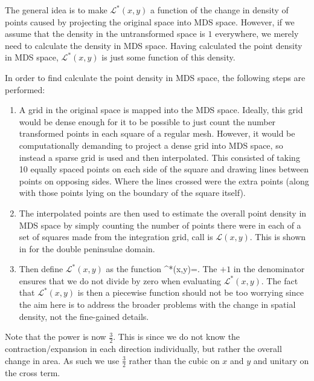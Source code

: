 {The general idea is to make $\mathcal{L}^*(x,y)$ a function of the change in density of points caused by projecting the original space into MDS space. However, if we assume that the density in the untransformed space is $1$ everywhere, we merely need to calculate the density in MDS space. Having calculated the point density in MDS space, $\mathcal{L}^*(x,y)$ is just some function of this density.

In order to find calculate the point density in MDS space, the following steps are performed:

\begin{enumerate}
\item A grid in the original space is mapped into the MDS space. Ideally, this grid would be dense enough for it to be possible to just count the number transformed points in each square of a regular mesh. However, it would be computationally demanding to project a dense grid into MDS space, so instead a sparse grid is used and then interpolated. This consisted of taking 10 equally spaced points on each side of the square and drawing lines between points on opposing sides. Where the lines crossed were the extra points (along with those points lying on the boundary of the square itself).
\item The interpolated points are then used to estimate the overall point density in MDS space by simply counting the number of points there were in each of a set of squares made from the integration grid, call is $\mathcal{L}(x,y)$. This is shown in  for the double peninsulae domain. 
\item Then define $\mathcal{L}^*(x,y)$ as the function
\be
{}^*(x,y)=.
\ee
The $+1$ in the denominator ensures that we do not divide by zero when evaluating $\mathcal{L}^*(x,y)$. The fact that $\mathcal{L}^*(x,y)$ is then a piecewise function should not be too worrying since the aim here is to address the broader problems with the change in spatial density, not the fine-gained details.
\end{enumerate}

Note that the power is now $\frac{3}{2}$. This is since we do not know the contraction/expansion in each direction individually, but rather the overall change in area. As such we use $\frac{3}{2}$ rather than the cubic on $x$ and $y$ and unitary on the cross term.

}

